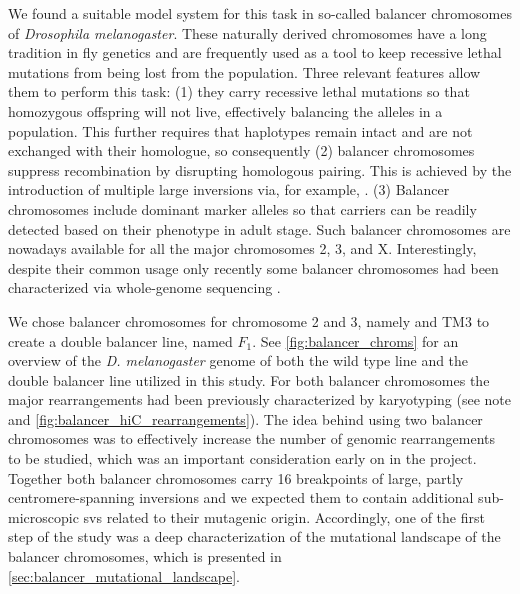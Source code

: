 We found a suitable model system for this task in so-called balancer chromosomes
of \textit{Drosophila melanogaster}. These naturally derived chromosomes have a
long tradition in fly genetics and are frequently used as a tool to keep
recessive lethal mutations from being lost from the population. Three relevant
features allow them to perform this task: (1) they carry recessive lethal
mutations so that homozygous offspring will not live, effectively balancing the
alleles in a population. This further requires that haplotypes remain intact and
are not exchanged with their homologue, so consequently (2) balancer chromosomes
suppress recombination by disrupting homologous pairing. This is achieved by the
introduction of multiple large inversions via, for example,
.
(3) Balancer chromosomes include dominant marker alleles so that carriers can be
readily detected based on their phenotype in adult stage. Such balancer
chromosomes are nowadays available for all the major chromosomes 2, 3, and X.
Interestingly, despite their common usage only recently some balancer
chromosomes had been characterized via whole-genome sequencing \citep{Miller2016}.

We chose balancer chromosomes for chromosome 2 and 3, namely 
and TM3 \citep{Tinderholt1960} to create a double balancer line, named $F_1$.
See \cref{fig:balancer_chroms} for an overview of the \textit{D. melanogaster}
genome of both the wild type line and the double balancer line utilized in this
study. For both balancer chromosomes the major rearrangements had been
previously characterized by karyotyping (see
note and
\cref{fig:balancer_hiC_rearrangements}). The idea behind using two balancer
chromosomes was to effectively increase the number of genomic rearrangements to
be studied, which was an important consideration early on in the project.
Together both balancer chromosomes carry 16 breakpoints of large, partly
centromere-spanning inversions and we expected them to contain additional
sub-microscopic \acp{sv} related to their mutagenic origin. Accordingly, one of
the first step of the study was a deep characterization of the mutational
landscape  of the balancer chromosomes, which is presented in
\cref{sec:balancer_mutational_landscape}.





